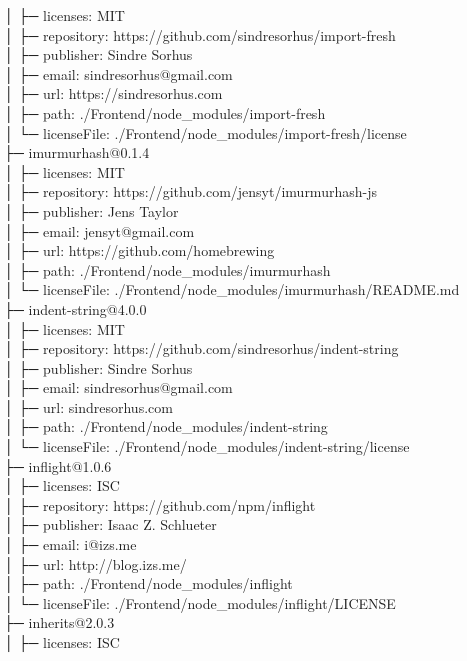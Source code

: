 │  ├─ licenses: MIT\\
│  ├─ repository: https://github.com/sindresorhus/import-fresh\\
│  ├─ publisher: Sindre Sorhus\\
│  ├─ email: sindresorhus@gmail.com\\
│  ├─ url: https://sindresorhus.com\\
│  ├─ path: ./Frontend/node\_modules/import-fresh\\
│  └─ licenseFile: ./Frontend/node\_modules/import-fresh/license\\
├─ imurmurhash@0.1.4\\
│  ├─ licenses: MIT\\
│  ├─ repository: https://github.com/jensyt/imurmurhash-js\\
│  ├─ publisher: Jens Taylor\\
│  ├─ email: jensyt@gmail.com\\
│  ├─ url: https://github.com/homebrewing\\
│  ├─ path: ./Frontend/node\_modules/imurmurhash\\
│  └─ licenseFile: ./Frontend/node\_modules/imurmurhash/README.md\\
├─ indent-string@4.0.0\\
│  ├─ licenses: MIT\\
│  ├─ repository: https://github.com/sindresorhus/indent-string\\
│  ├─ publisher: Sindre Sorhus\\
│  ├─ email: sindresorhus@gmail.com\\
│  ├─ url: sindresorhus.com\\
│  ├─ path: ./Frontend/node\_modules/indent-string\\
│  └─ licenseFile: ./Frontend/node\_modules/indent-string/license\\
├─ inflight@1.0.6\\
│  ├─ licenses: ISC\\
│  ├─ repository: https://github.com/npm/inflight\\
│  ├─ publisher: Isaac Z. Schlueter\\
│  ├─ email: i@izs.me\\
│  ├─ url: http://blog.izs.me/\\
│  ├─ path: ./Frontend/node\_modules/inflight\\
│  └─ licenseFile: ./Frontend/node\_modules/inflight/LICENSE\\
├─ inherits@2.0.3\\
│  ├─ licenses: ISC\\
